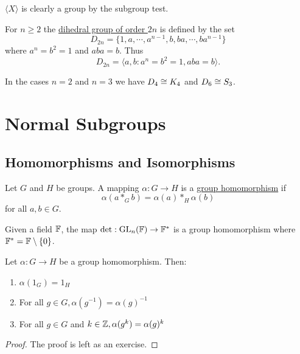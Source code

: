 \documentclass[11pt]{article}
\begin{document}
\begin{note}
    $\langle X\rangle$ is clearly a group by the subgroup test.
\end{note}

\begin{definition}
    For $n\geq2$ the \ul{dihedral group of order $2n$} is defined by the set
    \[D_{2n}=\{1,a,\cdots,a^{n-1},b,ba,\cdots,ba^{n-1}\}\]
    where $a^n=b^2=1$ and $aba=b$. Thus
    \[D_{2n}=\langle a,b:a^n=b^2=1,aba=b\rangle.\]
\end{definition}

\begin{remark}
    In the cases $n=2$ and $n=3$ we have $D_4\cong K_4$ and $D_6\cong S_3$.
\end{remark}

\section{Normal Subgroups}

\subsection{Homomorphisms and Isomorphisms}

\begin{definition}
    Let $G$ and $H$ be groups. A mapping $\alpha:G\to H$ is a \ul{group homomorphism} if
    \[\alpha(a*_Gb)=\alpha(a)*_H\alpha(b)\]
    for all $a,b\in G$.
\end{definition}

\begin{example}
    Given a field $\mathbb{F}$, the map $\det:\operatorname{GL}_n(\mathbb{F})\to\mathbb{F}^*$ is a group homomorphism where $\mathbb{F}^*=\mathbb{F}\setminus\{0\}$.
\end{example}

\begin{proposition}
    Let $\alpha:G\to H$ be a group homomorphism. Then:
    \begin{enumerate}
        \item $\alpha(1_G)=1_H$
        \item For all $g\in G,\alpha(g^{-1})=\alpha(g)^{-1}$
        \item For all $g\in G$ and $k\in\mathbb{Z},\alpha(g^k)=\alpha(g)^k$
    \end{enumerate}
\end{proposition}

\begin{proof}
    The proof is left as an exercise.
\end{proof}
\end{document}
